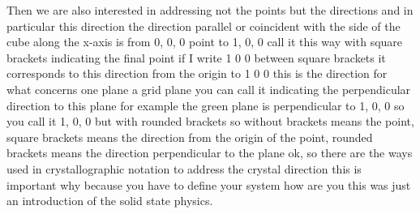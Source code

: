 Then we are also interested in addressing not the points but the directions and in particular this direction the direction parallel or coincident with the side of the cube along the x-axis is from 0, 0, 0 point to 1, 0, 0 call it this way with square brackets indicating the final point if I write 1 0 0 between square brackets it corresponds to this direction from the origin to 1 0 0 this is the direction for what concerns one plane a grid plane you can call it indicating the perpendicular direction to this plane for example the green plane is perpendicular to 1, 0, 0 so you call it 1, 0, 0 but with rounded brackets so without brackets means the point, square brackets means the direction from the origin of the point, rounded brackets means the direction perpendicular to the plane ok, so there are the ways used in crystallographic notation to address the crystal direction this is important why because you have to define your system how are you this was just an introduction of the solid state physics.
